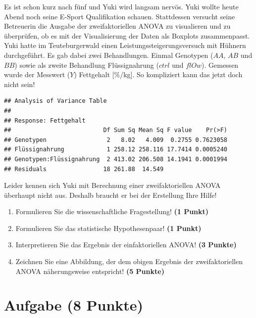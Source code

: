 \documentclass[a4paper, 9pt]{scrartcl}\usepackage[]{graphicx}\usepackage[]{xcolor}
\makeatletter
\newenvironment{kframe}{%
 \def\at@end@of@kframe{}%
 \ifinner\ifhmode%
  \def\at@end@of@kframe{\end{minipage}}%
  \begin{minipage}{\columnwidth}%
 \fi\fi%
 \def\FrameCommand##1{\hskip\@totalleftmargin \hskip-\fboxsep
 \colorbox{shadecolor}{##1}\hskip-\fboxsep
     \hskip-\linewidth \hskip-\@totalleftmargin \hskip\columnwidth}%
 \MakeFramed {\advance\hsize-\width
   \@totalleftmargin\z@ \linewidth\hsize
   \@setminipage}}%
 {\par\unskip\endMakeFramed%
 \at@end@of@kframe}
\newenvironment{knitrout}{}{} %
\makeatother
\begin{document}
Es ist schon kurz nach fünf und Yuki wird langsam nervös. Yuki wollte heute Abend noch seine E-Sport Qualifikation schauen. Stattdessen versucht seine Betreuerin die Ausgabe der zweifaktoriellen ANOVA zu visualieren und zu überprüfen, ob es mit der Visualisierung der Daten als Boxplots zusammenpasst. Yuki hatte im Teuteburgerwald einen Leistungssteigerungsversuch mit Hühnern durchgeführt. Es gab dabei zwei Behandlungen. Einmal Genotypen ($AA$, $AB$ und $BB$) sowie als zweite Behandlung Flüssignahrung ($ctrl$ und $flOw$). Gemessen wurde der Messwert ($Y$) Fettgehalt [\%/kg]. So kompliziert kann das jetzt doch nicht sein!

\begin{knitrout}
\color{fgcolor}\begin{kframe}
\begin{verbatim}
## Analysis of Variance Table
## 
## Response: Fettgehalt
##                          Df Sum Sq Mean Sq F value    Pr(>F)
## Genotypen                 2   8.02   4.009  0.2755 0.7623058
## Flüssignahrung            1 258.12 258.116 17.7414 0.0005240
## Genotypen:Flüssignahrung  2 413.02 206.508 14.1941 0.0001994
## Residuals                18 261.88  14.549
\end{verbatim}
\end{kframe}
\end{knitrout}

\vspace{1ex}

Leider kennen sich Yuki mit Berechnung einer zweifaktoriellen ANOVA überhaupt nicht aus. Deshalb braucht er bei der Erstellung Ihre Hilfe! 

\begin{enumerate}
  \item Formulieren Sie die wissenschaftliche Fragestellung! \textbf{(1 Punkt)}
  \item Formulieren Sie das statistische Hypothesenpaar! \textbf{(1 Punkt)}
\item Interpretieren Sie das Ergebnis der einfaktoriellen ANOVA! \textbf{(3 Punkte)} 
\item Zeichnen Sie eine Abbildung, der dem obigen Ergebnis der
  zweifaktoriellen ANOVA näherungsweise entspricht! \textbf{(5 Punkte)}
\end{enumerate}
 
\clearpage

\section{Aufgabe \hfill (8 Punkte)}
\end{document}
